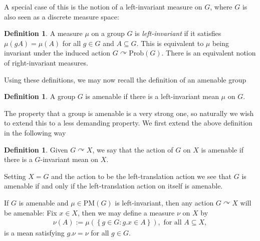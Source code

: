 \documentclass[10pt,oneside,openany,final]{memoir}
\theoremstyle{definition}
\newtheorem{definition}[theorem]{Definition}
\theoremstyle{Break}
\newcommand{\Prob}{\mathrm{Prob}}
\newcommand{\PM}{\mathrm{PM}}
\def\acts{\curvearrowright}
\begin{document}
A special case of this is the notion of a left-invariant measure on $G$, where $G$ is also seen as a discrete measure space:
\begin{definition}
	A measure $\mu$ on a group $G$ is \emph{left-invariant} if it satisfies $\mu(gA)=\mu(A)$ for all $g \in G$ and $A \subseteq G$. This is equivalent to $\mu$ being invariant under the induced action $G \acts \Prob(G)$. There is an equivalent notion of right-invariant measures.
\end{definition}
Using these definitions, we may now recall the definition of an amenable group
\begin{definition}
	A group $G$ is amenable if there is a left-invariant mean $\mu$ on $G$.
\end{definition}
The property that a group is amenable is a very strong one, so naturally we wish to extend this to a less demanding property. We first extend the above definition in the following way
\begin{definition}
	Given $G \acts X$, we say that the action of $G$ on $X$ is amenable if there is a $G$-invariant mean on $X$.  
\end{definition}
Setting $X=G$ and the action to be the left-translation action we see that $G$ is amenable if and only if the left-translation action on itself is amenable.

If $G$ is amenable and $\mu\in \PM(G)$ is left-invariant, then any action $G \acts X$ will be amenable: Fix $x \in X$, then we may define a measure $\nu$ on $X$ by
\begin{align*}
	\nu(A):=\mu(\left\{ g \in G : g.x \in A \right\}), \text{ for all } A \subseteq X,
\end{align*}
is a mean satisfying $g.\nu=\nu$ for all $g \in G$.
\end{document}
